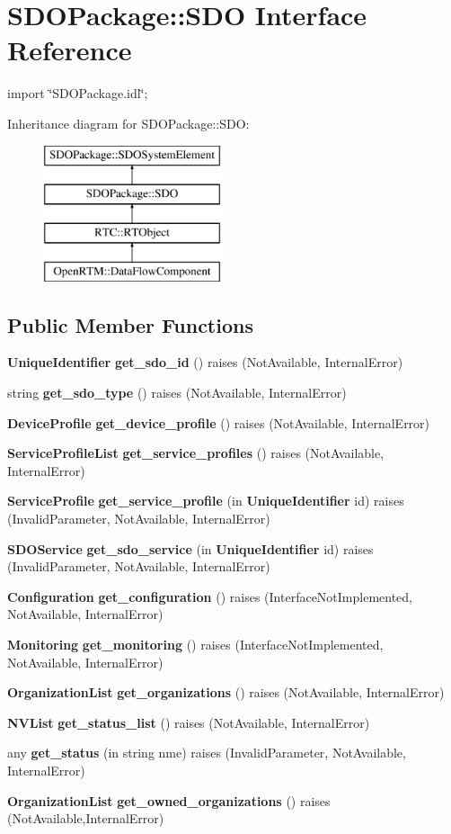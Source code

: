 \section{SDOPackage::SDO Interface Reference}
\label{interfaceSDOPackage_1_1SDO}


{\ttfamily import \char`\"{}SDOPackage.idl\char`\"{};}

Inheritance diagram for SDOPackage::SDO:\begin{figure}[H]
\begin{center}
\leavevmode
\includegraphics[height=4cm]{interfaceSDOPackage_1_1SDO}
\end{center}
\end{figure}
\subsection*{Public Member Functions}
\begin{DoxyCompactItemize}
\item 
{\bf UniqueIdentifier} {\bf get\_\-sdo\_\-id} ()  raises (NotAvailable, InternalError)
\item 
string {\bf get\_\-sdo\_\-type} ()  raises (NotAvailable, InternalError)
\item 
{\bf DeviceProfile} {\bf get\_\-device\_\-profile} ()  raises (NotAvailable, InternalError)
\item 
{\bf ServiceProfileList} {\bf get\_\-service\_\-profiles} ()  raises (NotAvailable, InternalError)
\item 
{\bf ServiceProfile} {\bf get\_\-service\_\-profile} (in {\bf UniqueIdentifier} id)  raises (InvalidParameter, NotAvailable, InternalError)
\item 
{\bf SDOService} {\bf get\_\-sdo\_\-service} (in {\bf UniqueIdentifier} id)  raises (InvalidParameter, NotAvailable, InternalError)
\item 
{\bf Configuration} {\bf get\_\-configuration} ()  raises (InterfaceNotImplemented, NotAvailable, InternalError)
\item 
{\bf Monitoring} {\bf get\_\-monitoring} ()  raises (InterfaceNotImplemented, NotAvailable, InternalError)
\item 
{\bf OrganizationList} {\bf get\_\-organizations} ()  raises (NotAvailable, InternalError)
\item 
{\bf NVList} {\bf get\_\-status\_\-list} ()  raises (NotAvailable, InternalError)
\item 
any {\bf get\_\-status} (in string nme)  raises (InvalidParameter, NotAvailable, InternalError)
\item 
{\bf OrganizationList} {\bf get\_\-owned\_\-organizations} ()  raises (NotAvailable,InternalError)
\end{DoxyCompactItemize}


